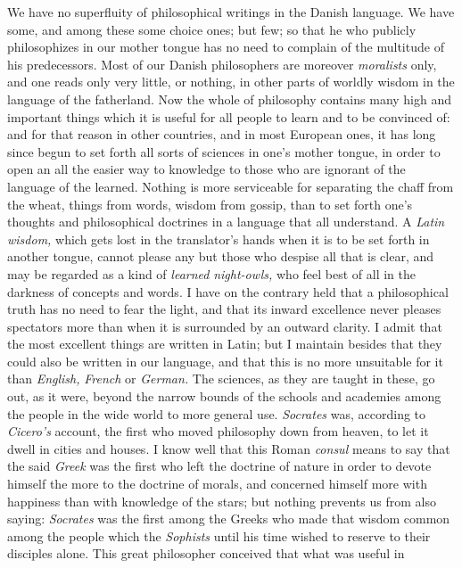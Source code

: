 \documentclass[12pt,a4paper,openany]{book}
\newcommand{\opage}[1]{\marginnote{\footnotesize\textit{[#1]}}}
\begin{document}
We have no superfluity of philosophical writings in the Danish language. We have
some, and among these some choice ones; but few; so that he who publicly
philosophizes in our mother tongue has no need to complain of the multitude of his
predecessors. Most of our Danish philosophers are moreover \emph{moralists} only,
and one reads only very little, or nothing, in other parts of worldly wisdom in
the language of the fatherland. Now the whole of philosophy contains many high and
important things which it is useful for all people to learn and to be convinced
of: and for that reason in other countries, and in most European ones, it has long since
begun to set forth all sorts of sciences in one's mother tongue, in order to open
an all the easier way to knowledge to those who are ignorant of the language of
the learned. Nothing is more serviceable for separating the chaff from the wheat,
things from words, wisdom from gossip, than to set forth one's thoughts and
philosophical doctrines in a language that all understand.
\setcounter{footnote}{0}%
\opage{37}A \emph{Latin wisdom,} which gets lost in the translator's hands when it is to
be set forth in another tongue, cannot please any but those who despise all that
is clear, and may be regarded as a kind of \emph{learned}
\emph{night-owls,} who feel
best of all in the darkness of concepts and words. I have on the contrary held
that a philosophical truth has no need to fear the light, and that its inward
excellence never pleases spectators more than when it is surrounded by an outward
clarity. I admit that the most excellent things are written in Latin; but I
maintain besides that they could also be written in our language, and that this
is no more unsuitable for it than \emph{English,} \emph{French} or
\emph{German.} The sciences, as they are taught in these, go out, as it were,
beyond the narrow bounds of the schools and academies among the people in the wide
world to more general use. \textit{Socrates} was, according to \textit{Cicero's}
account, the first who moved philosophy down from heaven, to let it dwell in
cities and houses. I know well that this Roman \emph{consul} means to say that the
said \emph{Greek} was the first who left the doctrine of nature in order to devote
himself the more to the doctrine of morals, and concerned himself more with
happiness than with knowledge of the stars; but nothing prevents us from also
saying: \textit{Socrates} was the first among the Greeks who made that wisdom
common among the people which the \emph{Sophists} until his time wished to reserve
to their disciples alone. This great philosopher conceived that what was useful in
\end{document}

